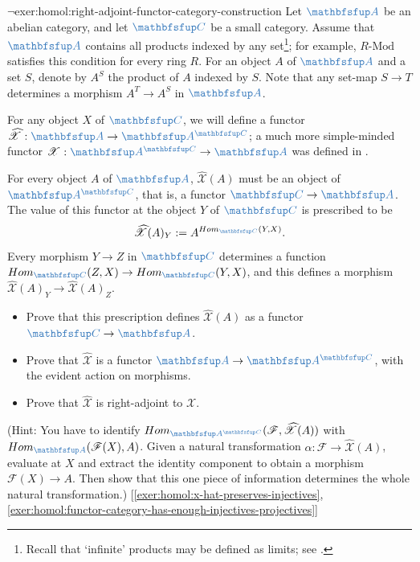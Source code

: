 \begin{exer}{$\lnot$}{exer:homol:right-adjoint-functor-category-construction}
  Let $\categ{A}$ be an abelian category, and let $\categ{C}$ be a
  small category. Assume that $\categ{A}$ contains all products
  indexed by any set\footnote{Recall that `infinite' products may be
    defined as limits; see .}; for example,
  $R\text{-Mod}$ satisfies this condition for every ring $R$. For an
  object $A$ of $\categ{A}$ and a set $S$, denote by $A^S$ the product
  of $A$ indexed by $S$. Note that any set-map $S \to T$ determines a
  morphism $A^T \to A^S$ in $\categ{A}$.

  For any object $X$ of $\categ{C}$, we will define a functor
  $\widehat{\mathscr{X}} : \categ{A} \to \categ{A}^{\categ{C}}$; a
  much more simple-minded functor
  $\mathscr{X} : \categ{A}^{\categ{C}} \to \categ{A}$ was defined in
  .

  For every object $A$ of $\categ{A}$, $\widehat{\mathscr{X}}(A)$ must
  be an object of $\categ{A}^{\categ{C}}$, that is, a functor
  $\categ{C} \to \categ{A}$. The value of this functor at the object
  $Y$ of $\categ{C}$ is prescribed to be
  \[
    \widehat{\mathscr{X}}(A)_Y := A^{\Hom_{\categ{C}}(Y,X)}.
  \]
  Every morphism $Y \to Z$ in $\categ{C}$ determines a function
  $\Hom_{\categ{C}}(Z,X) \to \Hom_{\categ{C}}(Y,X)$, and this defines
  a morphism
  $\widehat{\mathscr{X}}(A)_Y \to \widehat{\mathscr{X}}(A)_Z$.
  \begin{itemize}
  \item Prove that this prescription defines
    $\widehat{\mathscr{X}}(A)$ as a functor $\categ{C} \to \categ{A}$.
  \item Prove that $\widehat{\mathscr{X}}$ is a functor
    $\categ{A} \to \categ{A}^{\categ{C}}$, with the evident action on
    morphisms.
  \item Prove that $\widehat{\mathscr{X}}$ is right-adjoint to
    $\mathscr{X}$.
  \end{itemize}
  (Hint: You have to identify
  $\Hom_{\categ{A}^{\categ{C}}}(\mathscr{F},
  \widehat{\mathscr{X}}(A))$ with
  $\Hom_{\categ{A}}(\mathscr{F}(X), A)$. Given a natural
  transformation $\alpha : \mathscr{F} \to \widehat{\mathscr{X}}(A)$,
  evaluate at $X$ and extract the identity component to obtain a
  morphism $\mathscr{F}(X) \to A$. Then show that this one piece of
  information determines the whole natural transformation.)
  [\ref{exer:homol:x-hat-preserves-injectives},
  \ref{exer:homol:functor-category-has-enough-injectives-projectives}]
\end{exer}
